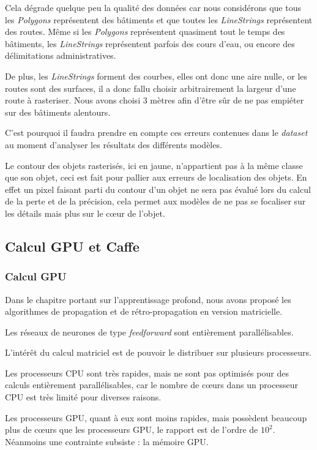 \documentclass[a4paper, 11pt]{report}
\begin{document}
Cela dégrade quelque peu la qualité des données car nous considérons que tous les \emph{Polygons} représentent des bâtiments et que toutes les \emph{LineStrings} représentent des routes. Même si les \emph{Polygons} représentent quasiment tout le temps des bâtiments, les \emph{LineStrings} représentent parfois des cours d'eau, ou encore des délimitations administratives.

De plus, les \emph{LineStrings} forment des courbes, elles ont donc une aire nulle, or les routes sont des surfaces, il a donc fallu choisir arbitrairement la largeur d'une route à rasteriser. Nous avons choisi $3$ mètres afin d'être sûr de ne pas empiéter sur des bâtiments alentours.

C'est pourquoi il faudra prendre en compte ces erreurs contenues dans le \emph{dataset} au moment d'analyser les résultats des différents modèles.

Le contour des objets rasterisés, ici en jaune, n'appartient pas à la même classe que son objet, ceci est fait pour pallier aux erreurs de localisation des objets. En effet un pixel faisant parti du contour d'un objet ne sera pas évalué lors du calcul de la perte et de la précision, cela permet aux modèles de ne pas se focaliser sur les détails mais plus sur le cœur de l'objet.
\subsection{Calcul GPU et Caffe}
\subsubsection{Calcul GPU}
Dans le chapitre portant sur l'apprentissage profond, nous avons proposé les algorithmes de propagation et de rétro-propagation en version matricielle.

Les réseaux de neurones de type \emph{feedforward} sont entièrement parallélisables.

L'intérêt du calcul matriciel est de pouvoir le distribuer sur plusieurs processeurs.

Les processeurs CPU sont très rapides, mais ne sont pas optimisés pour des calculs entièrement parallélisables, car le nombre de cœurs dans un processeur CPU est très limité pour diverses raisons.

Les processeurs GPU, quant à eux sont moins rapides, mais possèdent beaucoup plus de cœurs que les processeurs GPU, le rapport est de l'ordre de $10^2$. Néanmoins une contrainte subsiste : la mémoire GPU.
\end{document}
